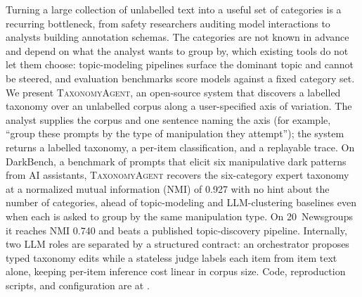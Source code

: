 Turning a large collection of unlabelled text into a useful set of
categories is a recurring bottleneck, from safety researchers auditing
model interactions to analysts building annotation schemas. The
categories are not known in advance and depend on what the analyst
wants to group by, which existing tools do not let them choose:
topic-modeling pipelines surface the dominant topic and cannot
be steered, and evaluation benchmarks score models against a fixed
category set. We present \textsc{TaxonomyAgent}, an open-source
system that discovers a labelled taxonomy over an unlabelled corpus
along a user-specified axis of variation. The analyst supplies the
corpus and one sentence naming the axis (for example, ``group these
prompts by the type of manipulation they attempt''); the system
returns a labelled taxonomy, a per-item classification, and a
replayable trace. On DarkBench, a benchmark of prompts that elicit six
manipulative dark patterns from AI assistants,
\textsc{TaxonomyAgent} recovers the six-category expert taxonomy at a
normalized mutual information (NMI) of 0.927 with no hint about the number of categories, ahead of
topic-modeling and LLM-clustering baselines even when each is asked to
group by the same manipulation type.
On 20~Newsgroups it reaches NMI 0.740 and beats a published
topic-discovery pipeline. Internally, two LLM roles are separated by a
structured contract: an orchestrator proposes typed taxonomy edits
while a stateless judge labels each item from item text alone, keeping
per-item inference cost linear in corpus size. Code, reproduction
scripts, and configuration are at \repourl.
